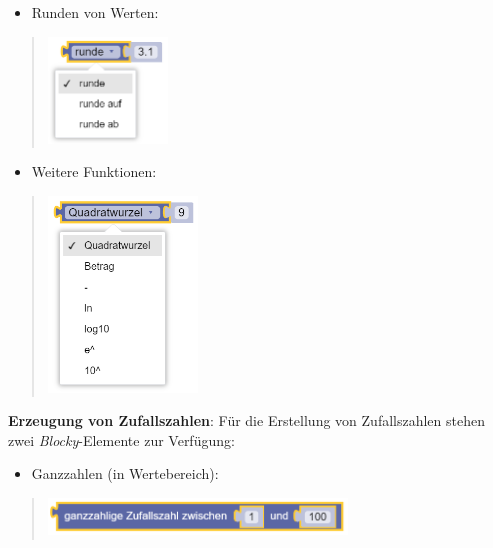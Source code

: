 \documentclass[
  letterpaper,
  DIV=11]{scrreprt}
\providecommand{\tightlist}{%
  \setlength{\itemsep}{0pt}\setlength{\parskip}{0pt}}\usepackage{longtable,booktabs,array}
\begin{document}
\begin{tcolorbox}
\begin{itemize}
\tightlist
\item
  Runden von Werten:
\end{itemize}

\begin{quote}
\includegraphics[width=1.25in,height=\textheight]{img/screenshot-blockly-math-function-rounding-01-DEU.png}
\end{quote}

\begin{itemize}
\tightlist
\item
  Weitere Funktionen:
\end{itemize}

\begin{quote}
\includegraphics[width=1.5625in,height=\textheight]{img/screenshot-blockly-math-function-misc-01-DEU.png}
\end{quote}

\textbf{Erzeugung von Zufallszahlen}: Für die Erstellung von
Zufallszahlen stehen zwei \emph{Blocky}-Elemente zur Verfügung:

\begin{itemize}
\tightlist
\item
  Ganzzahlen (in Wertebereich):
\end{itemize}

\begin{quote}
\includegraphics[width=3.125in,height=\textheight]{img/screenshot-blockly-math-function-random-integer-01-DEU.png}
\end{quote}


\end{tcolorbox}
\end{document}
